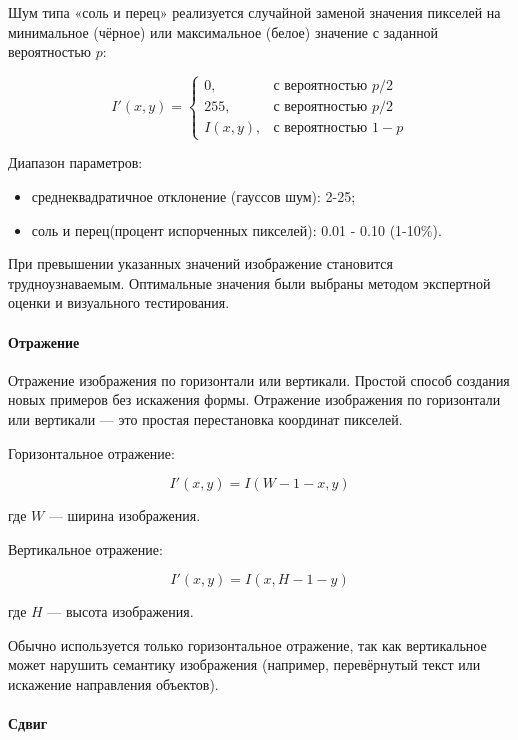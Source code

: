 Шум типа «соль и перец» реализуется случайной заменой значения пикселей на минимальное (чёрное) или максимальное (белое) значение с заданной вероятностью $p$:

\[
I'(x, y) =
\begin{cases}
	0, & \text{с вероятностью } p/2 \\
	255, & \text{с вероятностью } p/2 \\
	I(x, y), & \text{с вероятностью } 1 - p
\end{cases}
\]


Диапазон параметров:
\begin{itemize}
	\item среднеквадратичное отклонение (гауссов шум): 2-25;
	\item соль и перец(процент испорченных пикселей): 0.01 - 0.10 (1-10\%).
\end{itemize}

При превышении указанных значений изображение становится трудноузнаваемым. Оптимальные значения были выбраны методом экспертной оценки и визуального тестирования.


\paragraph{Отражение}
	
Отражение изображения по горизонтали или вертикали. Простой способ создания новых примеров без искажения формы. Отражение изображения по горизонтали или вертикали — это простая перестановка координат пикселей.


Горизонтальное отражение:

\[
I'(x, y) = I(W - 1 - x, y)
\]

где $W$ — ширина изображения.
	
Вертикальное отражение:

\[
I'(x, y) = I(x, H - 1 - y)
\]

где $H$ — высота изображения.


Обычно используется только горизонтальное отражение, так как вертикальное может нарушить семантику изображения (например, перевёрнутый текст или искажение направления объектов). 


\paragraph{Сдвиг}

